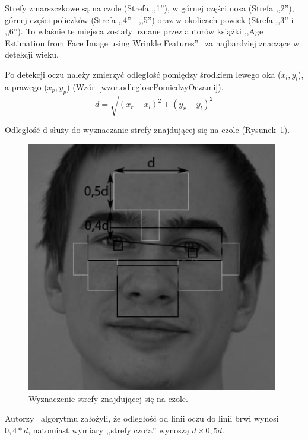 \documentclass[a4paper,twoside,12pt]{book}
\begin{document}
    Strefy zmarszczkowe są na czole (Strefa ,,1''), w górnej części nosa (Strefa ,,2''), górnej części policzków
    (Strefa ,,4'' i ,,5'') oraz w okolicach powiek (Strefa ,,3'' i ,,6'').
    To właśnie te miejsca zostały uznane przez autorów książki ,,Age Estimation from Face Image using Wrinkle
    Features''~\cite{wrinkleFeatures} za najbardziej znaczące w detekcji wieku.

    Po detekcji oczu należy zmierzyć odległość pomiędzy środkiem lewego oka ($x_{l},y_{l}$),
    a prawego ($x_{p},y_{p}$)
    (Wzór~\ref{wzor.odlegloscPomiedzyOczami}).
    \large
    \begin{equation}
        d= \sqrt{\left ( x_{r} - x_{l} \right )^{2}+\left (y_{r} - y_{l}  \right )^{2}}
        \label{wzor.odlegloscPomiedzyOczami}
    \end{equation}
    \normalsize

    Odległość d służy do wyznaczanie strefy znajdującej się na czole (Rysunek~\ref{fig.wyznaczenieCzola}).


    \begin{figure}
        \centering
        \includegraphics[width=11cm]{Obrazy/wyliczenieCzolka.jpg}
        \caption{Wyznaczenie strefy znajdującej się na czole.}
        \label{fig.wyznaczenieCzola}
    \end{figure}

    Autorzy~\cite{wrinkleFeatures} algorytmu założyli, że odległość od linii oczu do linii brwi wynosi $0,4 * d$,
    natomiast wymiary ,,strefy czoła'' wynoszą $d \times 0,5d$.
\end{document}
